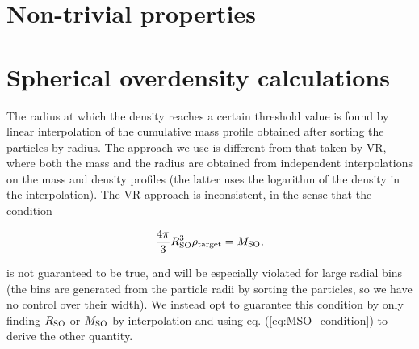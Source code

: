 \documentclass{article}
\begin{document}


\section{Non-trivial properties}



\section{Spherical overdensity calculations}

The radius at which the density reaches a certain threshold value is found by linear interpolation of the 
cumulative mass profile obtained after sorting the particles by radius. The approach we use is different from 
that taken by VR, where both the mass and the radius are obtained from independent interpolations on the mass 
and density profiles (the latter uses the logarithm of the density in the interpolation). The VR approach is 
inconsistent, in the sense that the condition

\begin{equation}
    \frac{4\pi{}}{3} R_{\rm{}SO}^3 \rho{}_{\rm{}target} = M_{\rm{}SO},\label{eq:MSO_condition}
\end{equation}

is not guaranteed to be true, and will be especially violated for large radial bins (the bins are generated 
from the particle radii by sorting the particles, so we have no control over their width). We instead opt to 
guarantee this condition by only finding $R_{\rm{}SO}$ or $M_{\rm{}SO}$ by interpolation and using eq. 
(\ref{eq:MSO_condition}) to derive the other quantity.
\end{document}
